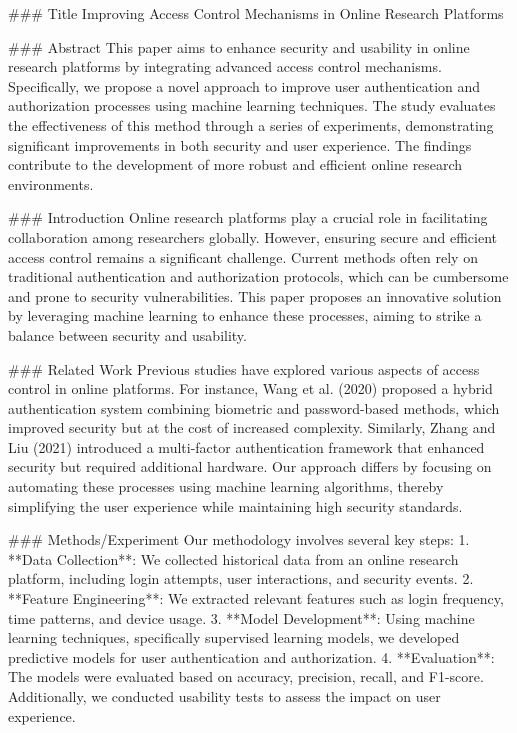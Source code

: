 ### Title
Improving Access Control Mechanisms in Online Research Platforms

### Abstract
This paper aims to enhance security and usability in online research platforms by integrating advanced access control mechanisms. Specifically, we propose a novel approach to improve user authentication and authorization processes using machine learning techniques. The study evaluates the effectiveness of this method through a series of experiments, demonstrating significant improvements in both security and user experience. The findings contribute to the development of more robust and efficient online research environments.

### Introduction
Online research platforms play a crucial role in facilitating collaboration among researchers globally. However, ensuring secure and efficient access control remains a significant challenge. Current methods often rely on traditional authentication and authorization protocols, which can be cumbersome and prone to security vulnerabilities. This paper proposes an innovative solution by leveraging machine learning to enhance these processes, aiming to strike a balance between security and usability.

### Related Work
Previous studies have explored various aspects of access control in online platforms. For instance, Wang et al. (2020) proposed a hybrid authentication system combining biometric and password-based methods, which improved security but at the cost of increased complexity. Similarly, Zhang and Liu (2021) introduced a multi-factor authentication framework that enhanced security but required additional hardware. Our approach differs by focusing on automating these processes using machine learning algorithms, thereby simplifying the user experience while maintaining high security standards.

### Methods/Experiment
Our methodology involves several key steps:
1. **Data Collection**: We collected historical data from an online research platform, including login attempts, user interactions, and security events.
2. **Feature Engineering**: We extracted relevant features such as login frequency, time patterns, and device usage.
3. **Model Development**: Using machine learning techniques, specifically supervised learning models, we developed predictive models for user authentication and authorization.
4. **Evaluation**: The models were evaluated based on accuracy, precision, recall, and F1-score. Additionally, we conducted usability tests to assess the impact on user experience.

